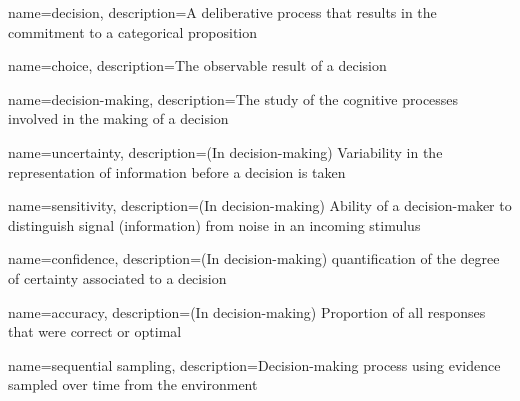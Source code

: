 {
    name=decision,
    description={A deliberative process that results in the commitment to a categorical proposition \cite{goldNeuralBasisDecision2007}}
}

{
    name=choice,
    description={The observable result of a decision}
}

{
    name=decision-making,
    description={The study of the cognitive processes involved in the making of a decision}
}

{
    name=uncertainty,
    description={(In decision-making) Variability in the representation of information before a decision is taken \cite{mamassianConfidenceForcedChoiceOther2020}}
}

{
    name=sensitivity,
    description={(In decision-making) Ability of a decision-maker to distinguish signal (information) from noise in an incoming stimulus}
}

{
    name=confidence,
    description={(In decision-making) quantification of the degree of certainty associated to a decision \cite{meynielConfidenceBayesianProbability2015}}
}

{
    name=accuracy,
    description={(In decision-making) Proportion of all responses that were correct or optimal}
}

{
    name=sequential sampling,
    description={Decision-making process using evidence sampled over time from the environment}
}